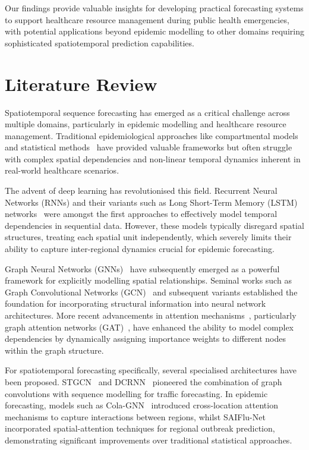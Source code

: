\documentclass[lettersize, journal]{IEEEtran}
\begin{document}
Our findings provide valuable insights for developing practical forecasting systems to support healthcare resource management during public health emergencies, with potential applications beyond epidemic modelling to other domains requiring sophisticated spatiotemporal prediction capabilities.

\section{Literature Review}
Spatiotemporal sequence forecasting has emerged as a critical challenge across multiple domains, particularly in epidemic modelling and healthcare resource management. Traditional epidemiological approaches like compartmental models~\cite{compartmentalmodel} and statistical methods~\cite{sirbasedmodel} have provided valuable frameworks but often struggle with complex spatial dependencies and non-linear temporal dynamics inherent in real-world healthcare scenarios.

The advent of deep learning has revolutionised this field. Recurrent Neural Networks (RNNs) and their variants such as Long Short-Term Memory (LSTM) networks~\cite{lstm} were amongst the first approaches to effectively model temporal dependencies in sequential data. However, these models typically disregard spatial structures, treating each spatial unit independently, which severely limits their ability to capture inter-regional dynamics crucial for epidemic forecasting.

Graph Neural Networks (GNNs)~\cite{gnn_survey} have subsequently emerged as a powerful framework for explicitly modelling spatial relationships. Seminal works such as Graph Convolutional Networks (GCN)~\cite{gcn} and subsequent variants established the foundation for incorporating structural information into neural network architectures. More recent advancements in attention mechanisms~\cite{attention_mechanisms}, particularly graph attention networks (GAT)~\cite{gat}, have enhanced the ability to model complex dependencies by dynamically assigning importance weights to different nodes within the graph structure.

For spatiotemporal forecasting specifically, several specialised architectures have been proposed. STGCN~\cite{stgcn} and DCRNN~\cite{dcrnn} pioneered the combination of graph convolutions with sequence modelling for traffic forecasting. In epidemic forecasting, models such as Cola-GNN~\cite{cola_gnn} introduced cross-location attention mechanisms to capture interactions between regions, whilst SAIFlu-Net~\cite{saiflu_net} incorporated spatial-attention techniques for regional outbreak prediction, demonstrating significant improvements over traditional statistical approaches.
\end{document}
